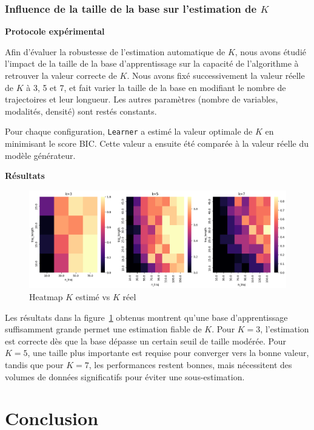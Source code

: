 \documentclass{article}
\begin{document}
\subsubsection{Influence de la taille de la base sur l'estimation de $K$}

\textbf{Protocole expérimental}

Afin d'évaluer la robustesse de l'estimation automatique de $K$, nous avons
étudié l'impact de la taille de la base d'apprentissage sur la capacité de
l'algorithme à retrouver la valeur correcte de $K$. Nous avons fixé successivement
la valeur réelle de $K$ à 3, 5 et 7, et fait varier la taille de la base en modifiant
le nombre de trajectoires et leur longueur. Les autres paramètres (nombre de
variables, modalités, densité) sont restés constants.

Pour chaque configuration, \texttt{Learner} a estimé la valeur optimale de $K$ en
minimisant le score BIC. Cette valeur a ensuite été comparée à la valeur réelle
du modèle générateur.

\textbf{Résultats}

\begin{figure}[ht]
    \centering
    \includegraphics[width=\linewidth]{img/KvK.png}
    \caption{Heatmap $K$ estimé vs $K$ réel}
    \label{fig:kvk}
\end{figure}

Les résultats dans la figure~\ref{fig:kvk} obtenus montrent qu'une base
d'apprentissage suffisamment grande permet une estimation fiable de $K$.
Pour $K=3$, l'estimation est correcte dès que la base dépasse un certain
seuil de taille modérée. Pour $K=5$, une taille plus importante est requise
pour converger vers la bonne valeur, tandis que pour $K=7$, les performances
restent bonnes, mais nécessitent des volumes de données significatifs pour
éviter une sous-estimation.


\section{Conclusion}
\end{document}
